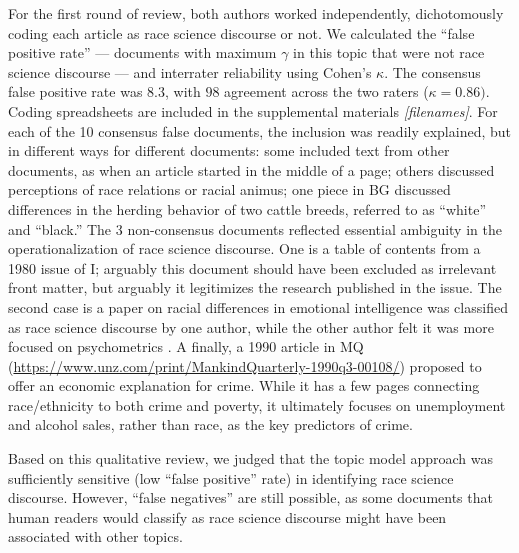 \documentclass[12pt]{article}
\newcounter{lastnote}
\begin{document}
For the first round of review, both authors worked independently, dichotomously coding each article as race science discourse or not. We calculated the ``false positive rate'' --- documents with maximum \(\gamma\) in this topic that were not race science discourse --- and interrater reliability using Cohen's \(\kappa\). The consensus false positive rate was \(8.3%
\), with \(98%
\) agreement across the two raters (\(\kappa = 0.86)\). Coding spreadsheets are included in the supplemental materials \emph{{[}filenames{]}}. For each of the 10 consensus false documents, the inclusion was readily explained, but in different ways for different documents: some included text from other documents, as when an article started in the middle of a page; others discussed perceptions of race relations or racial animus; one piece in BG discussed differences in the herding behavior of two cattle breeds, referred to as ``white'' and ``black.'' The 3 non-consensus documents reflected essential ambiguity in the operationalization of race science discourse. One is a table of contents from a 1980 issue of I; arguably this document should have been excluded as irrelevant front matter, but arguably it legitimizes the research published in the issue. The second case is a paper on racial differences in emotional intelligence was classified as race science discourse by one author, while the other author felt it was more focused on psychometrics \cite{GignacGroupDifferencesEI2010}. A finally, a 1990 article in MQ (\url{https://www.unz.com/print/MankindQuarterly-1990q3-00108/}) proposed to offer an economic explanation for crime. While it has a few pages connecting race/ethnicity to both crime and poverty, it ultimately focuses on unemployment and alcohol sales, rather than race, as the key predictors of crime.

Based on this qualitative review, we judged that the topic model approach was sufficiently sensitive (low ``false positive'' rate) in identifying race science discourse. However, ``false negatives'' are still possible, as some documents that human readers would classify as race science discourse might have been associated with other topics.

\clearpage




\end{document}

